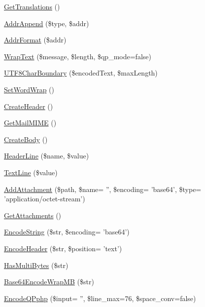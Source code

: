 \begin{DoxyCompactItemize}
\hyperlink{classPHPMailer_a792a70cfc3f64b1af6bfdad22241b2df}{Get\+Translations} ()
\item 
\hyperlink{classPHPMailer_ac15a3cde96d7928f4a43cd81d0911afb}{Addr\+Append} (\$type, \$addr)
\item 
\hyperlink{classPHPMailer_a626beaf7b877bd8d1f0f8c6869962bd2}{Addr\+Format} (\$addr)
\item 
\hyperlink{classPHPMailer_acc83d51c756e780535b39680bfa0e368}{Wrap\+Text} (\$message, \$length, \$qp\+\_\+mode=false)
\item 
\hyperlink{classPHPMailer_a5771594e3b02d05c624aec0d3d2930b3}{U\+T\+F8\+Char\+Boundary} (\$encoded\+Text, \$max\+Length)
\item 
\hyperlink{classPHPMailer_adbf94155c6a72aae101c0f5e0cf42823}{Set\+Word\+Wrap} ()
\item 
\hyperlink{classPHPMailer_a027a59d7e2b70753f182247934bf90bb}{Create\+Header} ()
\item 
\hyperlink{classPHPMailer_af696b69cbfc7f6cd3c2ac7701bc0bff4}{Get\+Mail\+M\+I\+M\+E} ()
\item 
\hyperlink{classPHPMailer_a878a0dc40ac9bc7f9a33aabd34728d1c}{Create\+Body} ()
\item 
\hyperlink{classPHPMailer_a8256a4880e4fb0ce1498abfcc1231674}{Header\+Line} (\$name, \$value)
\item 
\hyperlink{classPHPMailer_a626aa19ef9fda9132ee4c60a91f4869d}{Text\+Line} (\$value)
\item 
\hyperlink{classPHPMailer_ab10ab08da06063473d6408def22819fa}{Add\+Attachment} (\$path, \$name= '', \$encoding= 'base64', \$type= 'application/octet-\/stream')
\item 
\hyperlink{classPHPMailer_ae2ccce9b9fd39e70318eb55ebf16b113}{Get\+Attachments} ()
\item 
\hyperlink{classPHPMailer_ae864ca54059804bf909a03f25b01887a}{Encode\+String} (\$str, \$encoding= 'base64')
\item 
\hyperlink{classPHPMailer_a5c6862be627a60363fd470711c5ae0cc}{Encode\+Header} (\$str, \$position= 'text')
\item 
\hyperlink{classPHPMailer_ab470a97d2cad671a3c8e05c673b1e0d8}{Has\+Multi\+Bytes} (\$str)
\item 
\hyperlink{classPHPMailer_a898ae09e6b08a3db116744b6d44923c5}{Base64\+Encode\+Wrap\+M\+B} (\$str)
\item 
\hyperlink{classPHPMailer_a60cee38180f8a56cf7049582c73bb4f2}{Encode\+Q\+Pphp} (\$input= '', \$line\+\_\+max=76, \$space\+\_\+conv=false)
\item 

\end{DoxyCompactItemize}
